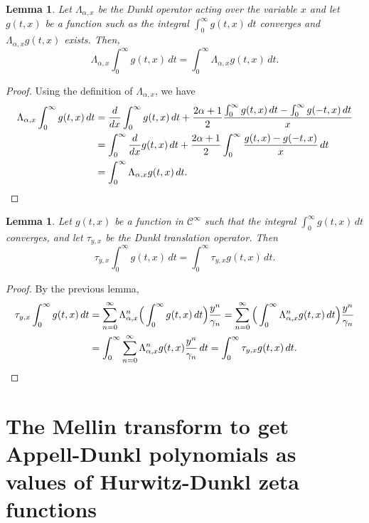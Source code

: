 \documentclass[a4paper]{amsart}
\newcommand{\cc}{\gamma}
\theoremstyle{plain}
\newtheorem{lemma}[theorem]{Lemma}
\theoremstyle{definition}
\theoremstyle{remark}
\numberwithin{equation}{section}
\begin{document}
\begin{lemma}
Let $\Lambda_{\alpha,x}$ be the Dunkl operator acting over the variable $x$ and let $g(t,x)$ be a function such as the integral $\int_{0}^{\infty} g(t,x) \,dt$ converges and $\Lambda_{\alpha,x} g(t,x)$ exists. Then,
\[
  \Lambda_{\alpha,x} \int_{0}^{\infty} g(t,x) \,dt 
  = \int_{0}^{\infty} \Lambda_{\alpha,x} g(t,x) \,dt.
\]
\end{lemma}

\begin{proof}
Using the definition of $\Lambda_{\alpha,x}$, we have
\begin{align*}
  \Lambda_{\alpha,x} \int_{0}^{\infty} g(t,x) \,dt
  &= \frac{d}{dx} \int_{0}^{\infty} g(t,x) \,dt
  + \frac{2\alpha+1}{2} \frac{\int_{0}^{\infty} g(t,x) \,dt 
  - \int_{0}^{\infty} g(-t,x) \,dt}{x} \\
  &= \int_{0}^{\infty} \frac{d}{dx} g(t,x) \,dt
  + \frac{2\alpha+1}{2} \int_{0}^{\infty} \frac{g(t,x) -  g(-t,x)}{x} \,dt  \\
  & = \int_{0}^{\infty} \Lambda_{\alpha,x} g(t,x) \,dt.
\qedhere
\end{align*}
\end{proof}

\begin{lemma}
\label{lem:tau-integral}
Let $g(t,x)$ be a function in $\mathcal{C}^{\infty}$ such that the integral $\int_{0}^{\infty} g(t,x) \,dt$ converges, and let $\tau_{y,x}$ be the Dunkl translation operator. Then
\[
  \tau_{y,x} \int_{0}^{\infty} g(t,x) \,dt = \int_{0}^{\infty} \tau_{y,x} g(t,x) \,dt.
\]
\end{lemma}

\begin{proof}
By the previous lemma,
\begin{align*}
  \tau_{y,x} \int_{0}^{\infty} g(t,x) \,dt
  &= \sum_{n=0}^{\infty} \Lambda_{\alpha,x}^n \Big(\int_{0}^{\infty} g(t,x) \,dt \Big)
  \frac{y^n}{\cc_n}
  = \sum_{n=0}^{\infty} \Big(\int_{0}^{\infty} \Lambda_{\alpha,x}^n g(t,x) \,dt \Big)
  \frac{y^n}{\cc_n} \\
  &=  \int_{0}^{\infty} \sum_{n=0}^{\infty} \Lambda_{\alpha,x}^n g(t,x) \frac{y^n}{\cc_n} \,dt 
  = \int_{0}^{\infty} \tau_{y,x} g(t,x) \,dt.
\qedhere
\end{align*}
\end{proof}

\section{The Mellin transform to get Appell-Dunkl polynomials as values of Hurwitz-Dunkl zeta functions}
\label{sec:Mellin}
\end{document}
